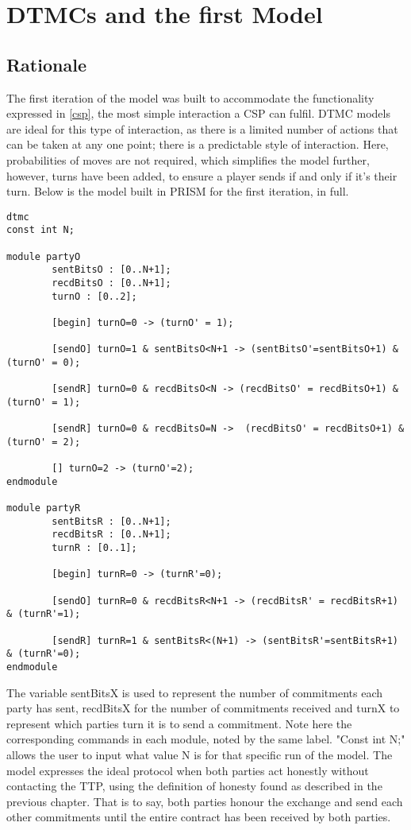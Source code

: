 \documentclass{l4proj}
\begin{document}
\chapter{DTMCs and the first Model}
\section{Rationale}
 The first iteration of the model was built to accommodate the functionality expressed in \ref{csp}, the most simple interaction a CSP can fulfil. DTMC models are ideal for this type of interaction, as there is a limited number of actions that can be taken at any one point; there is a predictable style of interaction. Here, probabilities of moves are not required, which simplifies the model further, however, turns have been added, to ensure a player sends if and only if it's their turn. Below is the model built in PRISM for the first iteration, in full.

\begin{lstlisting}
dtmc
const int N;

module partyO
        sentBitsO : [0..N+1];
        recdBitsO : [0..N+1];
        turnO : [0..2];
        
        [begin] turnO=0 -> (turnO' = 1);
    
        [sendO] turnO=1 & sentBitsO<N+1 -> (sentBitsO'=sentBitsO+1) & (turnO' = 0);

        [sendR] turnO=0 & recdBitsO<N -> (recdBitsO' = recdBitsO+1) & (turnO' = 1);

        [sendR] turnO=0 & recdBitsO=N ->  (recdBitsO' = recdBitsO+1) & (turnO' = 2);

        [] turnO=2 -> (turnO'=2);
endmodule

module partyR
        sentBitsR : [0..N+1];
        recdBitsR : [0..N+1];
        turnR : [0..1];  

        [begin] turnR=0 -> (turnR'=0);

        [sendO] turnR=0 & recdBitsR<N+1 -> (recdBitsR' = recdBitsR+1) & (turnR'=1);
        
        [sendR] turnR=1 & sentBitsR<(N+1) -> (sentBitsR'=sentBitsR+1) & (turnR'=0);
endmodule
\end{lstlisting}  

The variable sentBitsX is used to represent the number of commitments each party has sent, recdBitsX for the number of commitments received and turnX to represent which parties turn it is to send a commitment. Note here the corresponding commands in each module, noted by the same label.
"Const int N;" allows the user to input what value N is for that specific run of the model.
The model expresses the ideal protocol when both parties act honestly without contacting the TTP, using the definition of honesty found as described in the previous chapter. That is to say, both parties honour the exchange and send each other commitments until the entire contract has been received by both parties. 
\end{document}
